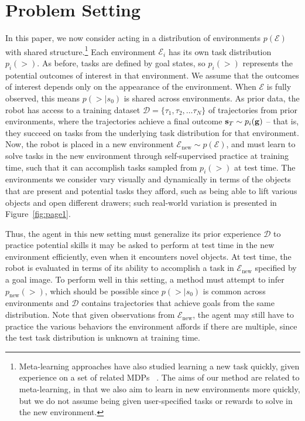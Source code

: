 \documentclass[letterpaper, 10 pt, conference]{ieeeconf}  %
\begin{document}
\section{Problem Setting}

In this paper, we now consider acting in a distribution of environments $p(\mathcal{E})$ with shared structure.\footnote{Meta-learning approaches have also studied learning a new task quickly, given experience on a set of related MDPs ~\cite{duan2016rl2, finn2017maml, rakelly2019pearl}. The aims of our method are related to meta-learning, in that we also aim to learn in new environments more quickly, but we do not assume being given user-specified tasks or rewards to solve in the new environment.}
Each environment $\mathcal{E}_i$ has its own task distribution $p_i(\gt)$. 
As before, tasks are defined by goal states, so $p_i(\gt)$ represents the potential outcomes of interest in that environment.
We assume that the outcomes of interest depends only on the appearance of the environment.
When $\mathcal{E}$ is fully observed, this means $p(\gt|s_0)$ is shared across environments.
As prior data, the robot has access to a training dataset $\mathcal{D} = \{\tau_1, \tau_2, \dots \tau_N\}$ of trajectories from prior environments, where the trajectories achieve a final outcome $\mathbf{s}_T \sim p_i(\mathbf{g})$ -- that is, they succeed on tasks from the underlying task distribution for that environment. 
Now, the robot is placed in a new environment $\mathcal{E}_\text{new} \sim p(\mathcal{E})$, and must learn to solve tasks in the new environment through self-supervised practice at training time, such that it can accomplish tasks sampled from $p_i(\gt)$ at test time.
The environments we consider vary visually and dynamically in terms of the objects that are present and potential tasks they afford, such as being able to lift various objects and open different drawers; such real-world variation is presented in Figure~\ref{fig:page1}.

Thus, the agent in this new setting must generalize its prior experience $\mathcal{D}$ to practice potential skills it may be asked to perform at test time in the new environment efficiently, even when it encounters novel objects.
At test time, the robot is evaluated in terms of its ability to accomplish a task in $\mathcal{E}_\text{new}$ specified by a goal image.
To perform well in this setting, a method must attempt to infer $p_\text{new}(\gt)$, which should be possible since $p(\gt|s_0)$ is common across environments and $\mathcal{D}$ contains trajectories that achieve goals from the same distribution.
Note that given observations from $\mathcal{E}_\text{new}$, the agent may still have to practice the various behaviors the environment affords if there are multiple, since the test task distribution is unknown at training time.
\end{document}
